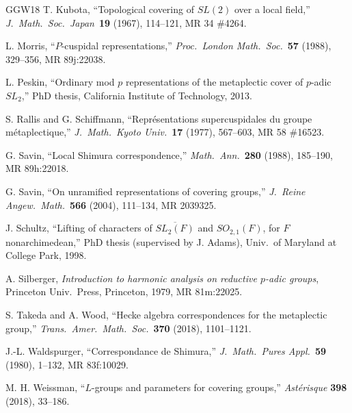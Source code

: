 \documentclass[12pt,letterpaper,reqno]{amsart}
\theoremstyle{definition}
\theoremstyle{remark}
\numberwithin{equation}{section}
\begin{document}
\begin{thebibliography}{GGW18}
 T. Kubota, ``Topological covering of $SL(2)$ over a local
field,'' \emph{J.\ Math.\ Soc.\ Japan}\ \textbf{19} (1967), 114--121,
MR 34 \#4264.

 L. Morris, ``$P$-cuspidal representations,'' \emph{Proc.\
London Math.\ Soc.}\ \textbf{57} (1988), 329--356, MR 89j:22038.

 L. Peskin, ``Ordinary mod $p$ representations of the
metaplectic cover of $p$-adic $SL_2$,'' PhD thesis, California Institute of
Technology, 2013.

 S. Rallis and G. Schiffmann, ``Repr\'esentations
supercuspidales du groupe m\'etaplectique,'' \emph{J.\ Math.\ Kyoto Univ.}\
\textbf{17} (1977), 567--603, MR 58 \#16523.

 G. Savin, ``Local Shimura correspondence,'' \emph{Math.\ Ann.}\
\textbf{280} (1988), 185--190, MR 89h:22018.

\bibitem[Sa04]{Sa04} G. Savin, ``On unramified representations of covering
groups,'' \emph{J.\ Reine Angew.\ Math.}\ \textbf{566} (2004), 111--134,
MR 2039325.

\bibitem[Sc98]{Sc98} J. Schultz, ``Lifting of characters of $\overline{SL_2(F)}$
and $SO_{2,1}(F)$, for $F$ nonarchimedean,'' PhD thesis (supervised by
J. Adams), Univ.\ of Maryland at College Park, 1998.

\bibitem[Si79]{Si79} A. Silberger, \emph{Introduction to harmonic analysis on
reductive $p$-adic groups}, Princeton Univ.\ Press, Princeton, 1979,
MR 81m:22025.

\bibitem[TW18]{TW18} S. Takeda and A. Wood, ``Hecke algebra correspondences
for the metaplectic group,'' \emph{Trans.\ Amer.\ Math.\ Soc.}\ \textbf{370}
(2018), 1101--1121.

\bibitem[Wa80]{Wa80} J.-L. Waldspurger, ``Correspondance de Shimura,'' \emph{J.\
Math.\ Pures Appl.}\ \textbf{59} (1980), 1--132, MR 83f:10029.

 M. H. Weissman, ``$L$-groups and parameters for covering
groups,'' \emph{Ast\'erisque} \textbf{398} (2018), 33--186.

\end{thebibliography}
\end{document}
